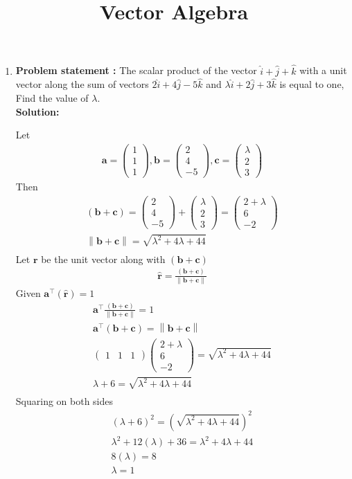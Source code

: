 \documentclass[12pt]{article}
\providecommand{\brak}[1]{\ensuremath{\left(#1\right)}}
\providecommand{\norm}[1]{\left\lVert#1\right\rVert}
\newcommand{\solution}{\noindent \textbf{Solution: }}
\newcommand{\myvec}[1]{\ensuremath{\begin{pmatrix}#1\end{pmatrix}}}
\let\vec\mathbf
\begin{document}
\begin{center}
\title{\textbf{Vector Algebra}}
\date{\vspace{-5ex}} %
\maketitle
\end{center}

\begin{enumerate}
\item\textbf{Problem statement :} The scalar product of the vector $\hat{i}+\hat{j}+\hat{k}$ with a unit vector along the sum of vectors $2\hat{i}+4\hat{j}-5\hat{k}$ and $\lambda\hat{i}+2\hat{j}+3\hat{k}$ is equal to one, Find the value of $\lambda$.
\\
\solution

Let
\begin{align}
\vec{a} =\myvec{1\\1\\1} , \vec{b}=\myvec{2\\4\\-5} , \vec{c}=\myvec{\lambda\\2\\3}
\end{align}
Then
\begin{align}
\brak{\vec{b}+\vec{c}}=\myvec{2\\4\\-5}+\myvec{\lambda\\2\\3}=\myvec{2+\lambda\\6\\-2}\\
{\norm{\vec{b}+\vec{c}}}={\sqrt{\lambda^2+4\lambda+44}}\\
\end{align}
Let $\vec{r}$ be the unit vector along with $\brak{\vec{b}+\vec{c}}$
\begin{align}
\hat{\vec{r}}=\frac{\brak{\vec{b}+\vec{c}}}{\norm{\vec{b}+\vec{c}}}
\end{align}
Given $\vec{a}^\top\brak{\vec{\hat{r}}} = 1$
\begin{align}
\vec{a}^\top\frac{\brak{\vec{b}+\vec{c}}}{\norm{\vec{b}+\vec{c}}}=1\\
\vec{a}^\top\brak{\vec{b}+\vec{c}}={\norm{\vec{b}+\vec{c}}}\\
\myvec{1&1&1}\myvec{2+\lambda \\ 6 \\ -2}= {\sqrt{\lambda^2+4\lambda+44}} \\
\lambda+6 = {\sqrt{\lambda^2+4\lambda+44}}\\
\end{align}
Squaring on both sides
\begin{align}
\brak{\lambda+6}^2 = \brak{{\sqrt{\lambda^2+4\lambda+44}}}^2\\
\lambda^2+12\brak{\lambda}+36 = \lambda^2+4\lambda+44\\
8\brak{\lambda} = 8\\
\lambda = 1
\end{align}
\end{enumerate}
\end{document}
